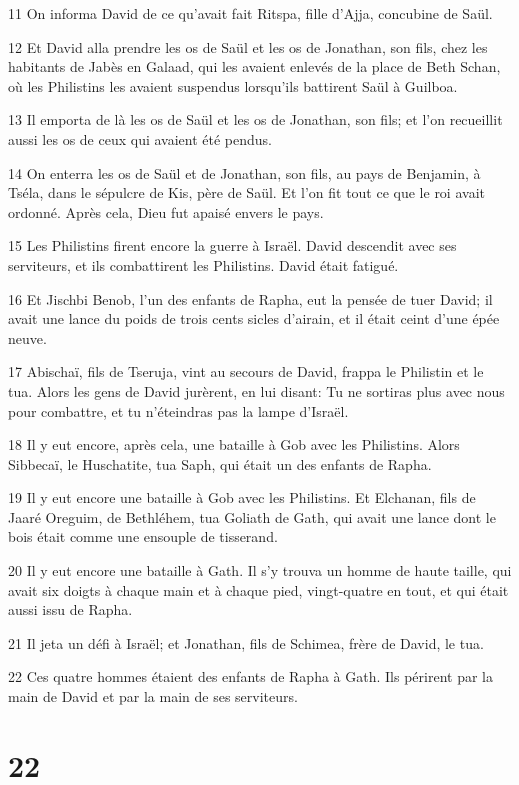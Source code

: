 \par 11 On informa David de ce qu'avait fait Ritspa, fille d'Ajja, concubine de Saül.
\par 12 Et David alla prendre les os de Saül et les os de Jonathan, son fils, chez les habitants de Jabès en Galaad, qui les avaient enlevés de la place de Beth Schan, où les Philistins les avaient suspendus lorsqu'ils battirent Saül à Guilboa.
\par 13 Il emporta de là les os de Saül et les os de Jonathan, son fils; et l'on recueillit aussi les os de ceux qui avaient été pendus.
\par 14 On enterra les os de Saül et de Jonathan, son fils, au pays de Benjamin, à Tséla, dans le sépulcre de Kis, père de Saül. Et l'on fit tout ce que le roi avait ordonné. Après cela, Dieu fut apaisé envers le pays.
\par 15 Les Philistins firent encore la guerre à Israël. David descendit avec ses serviteurs, et ils combattirent les Philistins. David était fatigué.
\par 16 Et Jischbi Benob, l'un des enfants de Rapha, eut la pensée de tuer David; il avait une lance du poids de trois cents sicles d'airain, et il était ceint d'une épée neuve.
\par 17 Abischaï, fils de Tseruja, vint au secours de David, frappa le Philistin et le tua. Alors les gens de David jurèrent, en lui disant: Tu ne sortiras plus avec nous pour combattre, et tu n'éteindras pas la lampe d'Israël.
\par 18 Il y eut encore, après cela, une bataille à Gob avec les Philistins. Alors Sibbecaï, le Huschatite, tua Saph, qui était un des enfants de Rapha.
\par 19 Il y eut encore une bataille à Gob avec les Philistins. Et Elchanan, fils de Jaaré Oreguim, de Bethléhem, tua Goliath de Gath, qui avait une lance dont le bois était comme une ensouple de tisserand.
\par 20 Il y eut encore une bataille à Gath. Il s'y trouva un homme de haute taille, qui avait six doigts à chaque main et à chaque pied, vingt-quatre en tout, et qui était aussi issu de Rapha.
\par 21 Il jeta un défi à Israël; et Jonathan, fils de Schimea, frère de David, le tua.
\par 22 Ces quatre hommes étaient des enfants de Rapha à Gath. Ils périrent par la main de David et par la main de ses serviteurs.

\chapter{22}

